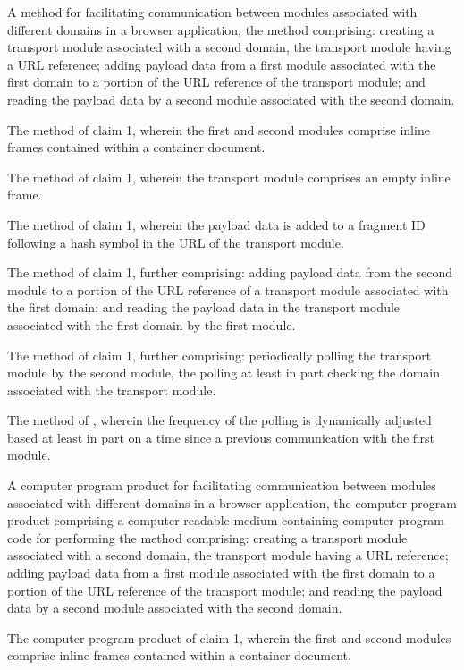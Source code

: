 \claims


A method for facilitating communication between modules associated with different domains in a browser application, the method comprising:
\el creating a transport module associated with a second domain, the transport module having a URL reference;
\el adding payload data from a first module associated with the first domain to a portion of the URL reference of the transport module; and
\el reading the payload data by a second module associated with the second domain.


The method of claim 1, wherein the first and second modules comprise inline frames contained within a container document.


The method of claim 1, wherein the transport module comprises an empty inline frame.


The method of claim 1, wherein the payload data is added to a fragment ID following a hash symbol in the URL of the transport module.


The method of claim 1, further comprising:
\el adding payload data from the second module to a portion of the URL reference of a transport module associated with the first domain; and
\el reading the payload data in the transport module associated with the first domain by the first module.


\label{pollingclaim} The method of claim 1, further comprising:
\el periodically polling the transport module by the second module, the polling at least in part checking the domain associated with the transport module.


The method of \pollingclaim{}, wherein the frequency of the polling is dynamically adjusted based at least in part on a time since a previous communication with the first module.


A computer program product for facilitating communication between modules associated with different domains in a browser application, the computer program product comprising a computer-readable medium containing computer program code for performing the method comprising:
\el creating a transport module associated with a second domain, the transport module having a URL reference;
\el adding payload data from a first module associated with the first domain to a portion of the URL reference of the transport module; and
\el reading the payload data by a second module associated with the second domain.


The computer program product of claim 1, wherein the first and second modules comprise inline frames contained within a container document.


